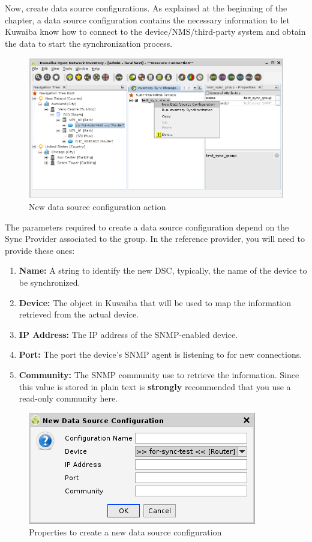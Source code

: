 \documentclass[a4paper]{article}
\begin{document}
			Now, create data source configurations. As explained at the beginning of the chapter, a data source configuration contains the necessary information to let Kuwaiba know how to connect to the device/NMS/third-party system and obtain the data to start the synchronization process.\\
			
			\begin{figure}[h!]
				\centering
				\includegraphics[width=0.8\linewidth]{img/sync_new_data_src_config.png}
				\caption{New data source configuration action}
				\label{fig:sync_new_data_src_config}
			\end{figure}
		
			\clearpage		
			
			The parameters required to create a data source configuration depend on the Sync Provider associated to the group. In the reference provider, you will need to provide these ones:
			\begin{enumerate}
				\item \textbf{Name:} A string to identify the new DSC, typically, the name of the device to be synchronized.
				\item \textbf{Device:} The object in Kuwaiba that will be used to map the information retrieved from the actual device. 
				\item \textbf{IP Address:} The IP address of the SNMP-enabled device.
				\item \textbf{Port:} The port the device's SNMP agent is listening to for new connections.
				\item \textbf{Community:} The SNMP community use to retrieve the information. Since this value is stored in plain text is \textbf{strongly} recommended that you use a read-only community here.
			\end{enumerate}
			
			\begin{figure}[h!]
				\centering
				\includegraphics[width=0.4\linewidth]{img/sync_data_src_confg_properties.png}
				\caption{Properties to create a new data source configuration}
				\label{fig:sync_data_src_confg_properties}
			\end{figure}
			
\end{document}
